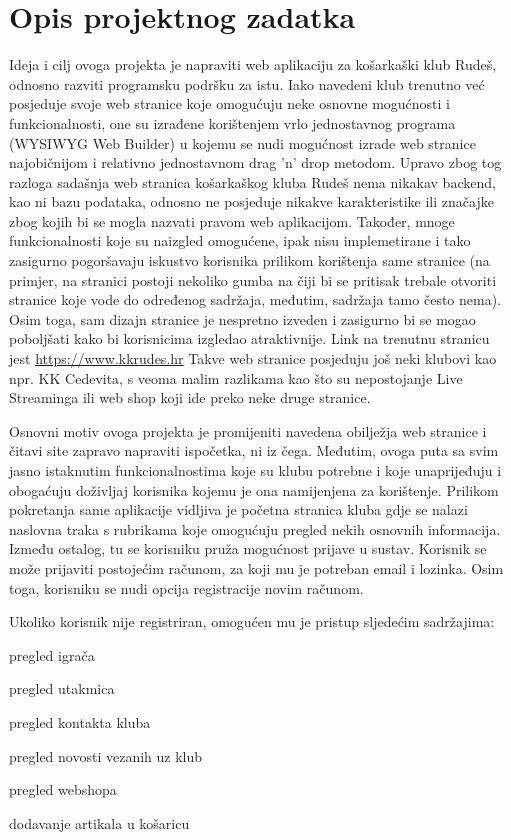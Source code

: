 \chapter{Opis projektnog zadatka}


\textnormal{Ideja i cilj ovoga projekta je napraviti web aplikaciju za košarkaški klub Rudeš, odnosno razviti programsku podršku za istu.
	Iako navedeni klub trenutno već posjeduje svoje web stranice koje omogućuju neke osnovne mogućnosti i funkcionalnosti, one su
	izrađene korištenjem vrlo jednostavnog programa (WYSIWYG Web Builder) u kojemu se nudi mogućnost izrade web stranice najobičnijom 
	i relativno jednostavnom drag 'n' drop metodom. Upravo zbog tog razloga sadašnja web stranica košarkaškog kluba Rudeš nema nikakav
	backend, kao ni bazu podataka, odnosno ne posjeduje nikakve karakteristike ili značajke zbog kojih bi se mogla nazvati pravom web 
	aplikacijom. Također, mnoge funkcionalnosti koje su naizgled omogućene, ipak nisu implemetirane i tako zasigurno pogoršavaju iskustvo 
	korisnika prilikom korištenja same stranice (na primjer, na stranici postoji nekoliko gumba na čiji bi se pritisak trebale otvoriti 
	stranice koje vode do određenog sadržaja, međutim, sadržaja tamo često nema). Osim toga, sam dizajn stranice je nespretno izveden i 
	zasigurno bi se mogao poboljšati kako bi korisnicima izgledao atraktivnije. Link na trenutnu stranicu jest \url{https://www.kkrudes.hr}
	Takve web stranice posjeduju još neki klubovi kao npr. KK Cedevita, s veoma malim razlikama kao što su nepostojanje Live Streaminga ili web shop koji ide preko neke druge stranice.
}

\bigbreak

\textnormal{Osnovni motiv ovoga projekta je promijeniti navedena obilježja web stranice i čitavi site zapravo napraviti ispočetka, ni iz čega.
	Međutim, ovoga puta sa svim jasno istaknutim funkcionalnostima koje su klubu potrebne i koje unaprijeđuju i obogaćuju doživljaj
	korisnika kojemu je ona namijenjena za korištenje.
	Prilikom pokretanja same aplikacije vidljiva je početna stranica kluba gdje se nalazi naslovna traka s rubrikama koje omogućuju 
	pregled nekih osnovnih informacija. Između ostalog, tu se korisniku pruža mogućnost prijave u sustav. Korisnik se može prijaviti 
	postojećim računom, za koji mu je potreban email i lozinka. Osim toga, korisniku se nudi opcija registracije novim računom.}

\pagebreak

\textnormal{Ukoliko korisnik nije registriran, omogućen mu je pristup sljedećim sadržajima:}
\begin{packed_item}
	\item pregled igrača
	\item pregled utakmica
	\item pregled kontakta kluba
	\item pregled novosti vezanih uz klub
	\item pregled webshopa
	\item dodavanje artikala u košaricu
\end{packed_item}

